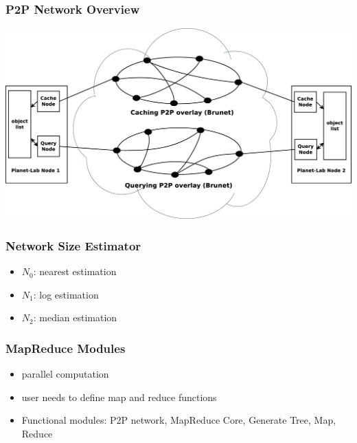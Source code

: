 \documentclass[red]{beamer}
\begin{document}
\begin{frame}
\frametitle{P2P Network Overview}
\begin{center}
\includegraphics[scale=0.17]{figs/brunet}
\end{center}
\end{frame}

\begin{frame}
\frametitle{Network Size Estimator}
\begin{itemize}
\item $N_0$: nearest estimation
\item $N_1$: log estimation
\item $N_2$: median estimation
\end{itemize}
\end{frame}

\begin{frame}
\frametitle{MapReduce Modules}
\begin{itemize}
\item parallel computation 
\item user needs to define map and reduce functions
\item Functional modules: P2P network, MapReduce Core, Generate Tree, Map, Reduce
\end{itemize}
\end{frame}
\end{document}
